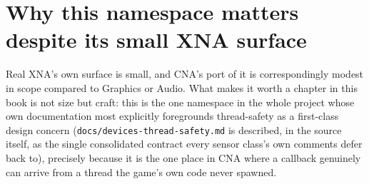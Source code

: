 \section{Why this namespace matters despite its small XNA surface}

Real XNA's own  surface is small, and CNA's port of it is
correspondingly modest in scope compared to Graphics or Audio. What makes it worth a chapter
in this book is not size but craft: this is the one namespace in the whole project whose own
documentation most explicitly foregrounds thread-safety as a first-class design concern
(\texttt{docs/devices-thread-safety.md} is described, in the source itself, as the single
consolidated contract every sensor class's own comments defer back to), precisely because it
is the one place in CNA where a callback genuinely can arrive from a thread the game's own
code never spawned.

